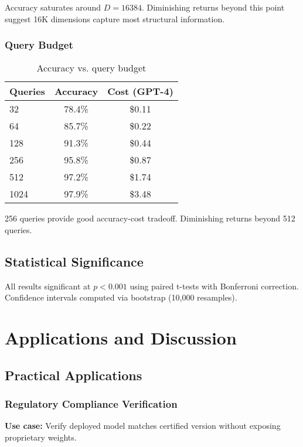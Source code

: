 \documentclass[11pt,a4paper]{article}
\begin{document}
Accuracy saturates around $D = 16384$. Diminishing returns beyond this point suggest 16K dimensions capture most structural information.

\subsubsection{Query Budget}

\begin{table}[h]
\centering
\caption{Accuracy vs. query budget}
\label{tab:queries}
\begin{tabular}{lcc}
\toprule
Queries & Accuracy & Cost (GPT-4) \\
\midrule
32 & 78.4\% & \$0.11 \\
64 & 85.7\% & \$0.22 \\
128 & 91.3\% & \$0.44 \\
256 & 95.8\% & \$0.87 \\
512 & 97.2\% & \$1.74 \\
1024 & 97.9\% & \$3.48 \\
\bottomrule
\end{tabular}
\end{table}

256 queries provide good accuracy-cost tradeoff. Diminishing returns beyond 512 queries.

\subsection{Statistical Significance}

All results significant at $p < 0.001$ using paired t-tests with Bonferroni correction. Confidence intervals computed via bootstrap (10,000 resamples).

\section{Applications and Discussion}

\subsection{Practical Applications}

\subsubsection{Regulatory Compliance Verification}

\textbf{Use case:} Verify deployed model matches certified version without exposing proprietary weights.
\end{document}
